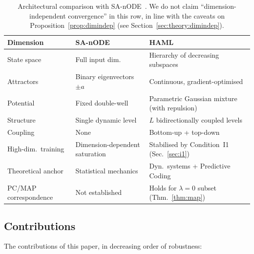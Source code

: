 \documentclass[11pt,a4paper]{article}
\begin{document}
\begin{table}[h]
\centering
\footnotesize
\setlength{\tabcolsep}{5pt}
\begin{tabular}{lll}
\toprule
\textbf{Dimension} & \textbf{SA-nODE} & \textbf{HAML} \\
\midrule
State space             & Full input dim.\               & Hierarchy of decreasing subspaces \\
Attractors              & Binary eigenvectors $\pm a$    & Continuous, gradient-optimised \\
Potential               & Fixed double-well              & Parametric Gaussian mixture (with repulsion) \\
Structure               & Single dynamic level           & $L$ bidirectionally coupled levels \\
Coupling                & None                           & Bottom-up + top-down \\
High-dim.\ training     & Dimension-dependent saturation & Stabilised by Condition~I1 (Sec.~\ref{sec:i1}) \\
Theoretical anchor      & Statistical mechanics          & Dyn.\ systems + Predictive Coding \\
PC/MAP correspondence   & Not established                & Holds for $\lambda{=}0$ subset (Thm.~\ref{thm:map}) \\
\bottomrule
\end{tabular}
\caption{Architectural comparison with SA-nODE~\cite{marino2024}. We do not claim
``dimension-independent convergence'' in this row, in line with the caveats on
Proposition~\ref{prop:dimindep} (see Section~\ref{sec:theory:dimindep}).}
\label{tab:comparison_sanode}
\end{table}

\subsection{Contributions}

The contributions of this paper, in decreasing order of robustness:
\end{document}
